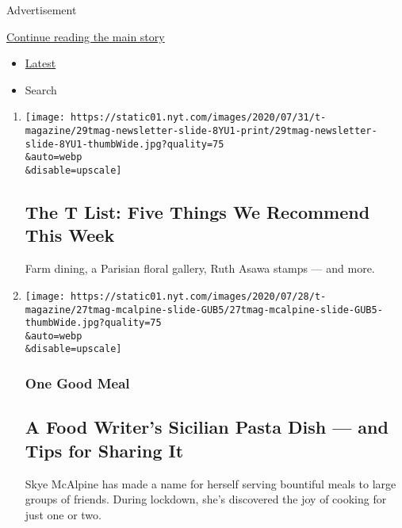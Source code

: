 Advertisement

\protect\hyperlink{after-mid1}{Continue reading the main story}

\begin{itemize}
\tightlist
\item
  \protect\hyperlink{stream-panel}{Latest}
\item
  Search
\end{itemize}

\begin{enumerate}
\def\labelenumi{\arabic{enumi}.}
\item
  \href{/2020/07/30/t-magazine/the-t-list-five-things-we-recommend-this-week.html}{}

  \texttt{[image: https://static01.nyt.com/images/2020/07/31/t-magazine/29tmag-newsletter-slide-8YU1-print/29tmag-newsletter-slide-8YU1-thumbWide.jpg?quality=75\\\&auto=webp\\\&disable=upscale]}

  \hypertarget{the-t-list-five-things-we-recommend-this-week}{%
  \subsection{The T List: Five Things We Recommend This
  Week}\label{the-t-list-five-things-we-recommend-this-week}}

  Farm dining, a Parisian floral gallery, Ruth Asawa stamps --- and
  more.
\item
  \href{/2020/07/29/t-magazine/skye-mcalpine-pasta-cooking.html}{}

  \texttt{[image: https://static01.nyt.com/images/2020/07/28/t-magazine/27tmag-mcalpine-slide-GUB5/27tmag-mcalpine-slide-GUB5-thumbWide.jpg?quality=75\\\&auto=webp\\\&disable=upscale]}

  \hypertarget{one-good-meal-4}{%
  \subsubsection{One Good Meal}\label{one-good-meal-4}}

  \hypertarget{a-food-writers-sicilian-pasta-dish--and-tips-for-sharing-it}{%
  \subsection{A Food Writer's Sicilian Pasta Dish --- and Tips for
  Sharing
  It}\label{a-food-writers-sicilian-pasta-dish--and-tips-for-sharing-it}}

  Skye McAlpine has made a name for herself serving bountiful meals to
  large groups of friends. During lockdown, she's discovered the joy of
  cooking for just one or two.


\end{enumerate}
